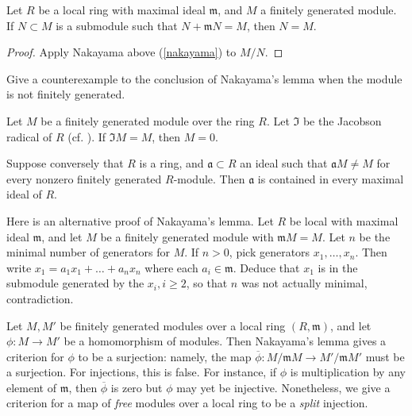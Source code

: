 \begin{corollary}
Let $R$ be a local ring with maximal ideal $\mathfrak{m}$, and $M$ a finitely
generated module. If $N \subset M$ is a submodule such that $N +
\mathfrak{m}N =
M$, then $N=M$.
\end{corollary}
\begin{proof}
Apply Nakayama above (\cref{nakayama}) to $M/N$.
\end{proof}

\begin{exercise}
Give a counterexample to the conclusion of Nakayama's lemma when the module is
not finitely generated.
\end{exercise}
\begin{exercise}
Let $M$ be a finitely generated module over the ring $R$. Let $\mathfrak{I}$
be the Jacobson
radical of $R$ (cf. ). If $\mathfrak{I} M = M$,
then $M =
0$.
\end{exercise}
\begin{exercise}
Suppose conversely that $R$ is a ring, and $\mathfrak{a} \subset R$ an ideal
such that $\mathfrak{a} M \neq M$ for every nonzero finitely generated
$R$-module. Then $\mathfrak{a}$ is contained in every maximal ideal of $R$.
\end{exercise}


\begin{exercise}
Here is an alternative proof of Nakayama's lemma. Let $R$ be local with
maximal ideal $\mathfrak{m}$, and let $M$ be a finitely generated module with
$\mathfrak{m}M = M$. Let $n$ be the minimal number of generators for $M$. If
$n>0$, pick generators $x_1, \dots, x_n$. Then write $x_1 = a_1 x_1 + \dots +
a_n x_n$ where each $a_i \in \mathfrak{m}$. Deduce that $x_1$ is in the
submodule generated by the $x_i, i \geq 2$, so that $n$ was not actually
minimal, contradiction.
\end{exercise}

Let $M, M'$ be finitely generated modules over a local ring $(R,
\mathfrak{m})$, and let $\phi: M \to M'$ be a homomorphism of modules. Then
Nakayama's lemma gives a criterion for $\phi$ to be a surjection: namely, the
map $\overline{\phi}: M/\mathfrak{m}M \to M'/\mathfrak{m}M'$ must be a surjection.
For injections, this is false. For instance, if $\phi$ is  multiplication by any element of
$\mathfrak{m}$, then $\overline{\phi}$ is zero but $\phi$ may yet be injective.
Nonetheless, we give a criterion for a map of \emph{free} modules over a local ring to
be a \emph{split}  injection.

